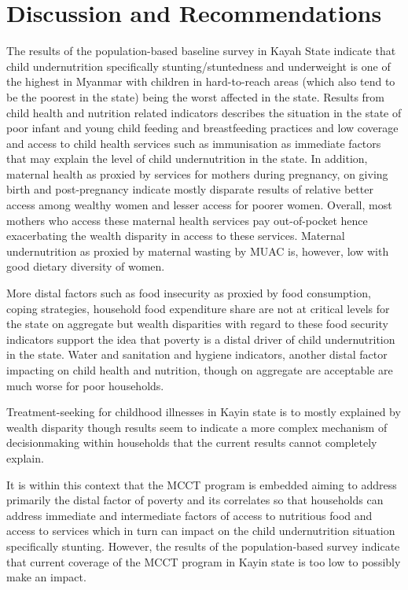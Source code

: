 \documentclass[12pt,a4paper]{article}
\begin{document}
\newpage

\hypertarget{discussion-and-recommendations}{%
\section{Discussion and Recommendations}\label{discussion-and-recommendations}}

The results of the population-based baseline survey in Kayah State indicate that child undernutrition specifically stunting/stuntedness and underweight is one of the highest in Myanmar with children in hard-to-reach areas (which also tend to be the poorest in the state) being the worst affected in the state. Results from child health and nutrition related indicators describes the situation in the state of poor infant and young child feeding and breastfeeding practices and low coverage and access to child health services such as immunisation as immediate factors that may explain the level of child undernutrition in the state. In addition, maternal health as proxied by services for mothers during pregnancy, on giving birth and post-pregnancy indicate mostly disparate results of relative better access among wealthy women and lesser access for poorer women. Overall, most mothers who access these maternal health services pay out-of-pocket hence exacerbating the wealth disparity in access to these services. Maternal undernutrition as proxied by maternal wasting by MUAC is, however, low with good dietary diversity of women.

More distal factors such as food insecurity as proxied by food consumption, coping strategies, household food expenditure share are not at critical levels for the state on aggregate but wealth disparities with regard to these food security indicators support the idea that poverty is a distal driver of child undernutrition in the state. Water and sanitation and hygiene indicators, another distal factor impacting on child health and nutrition, though on aggregate are acceptable are much worse for poor households.

Treatment-seeking for childhood illnesses in Kayin state is to mostly explained by wealth disparity though results seem to indicate a more complex mechanism of decisionmaking within households that the current results cannot completely explain.

It is within this context that the MCCT program is embedded aiming to address primarily the distal factor of poverty and its correlates so that households can address immediate and intermediate factors of access to nutritious food and access to services which in turn can impact on the child undernutrition situation specifically stunting. However, the results of the population-based survey indicate that current coverage of the MCCT program in Kayin state is too low to possibly make an impact.
\end{document}
